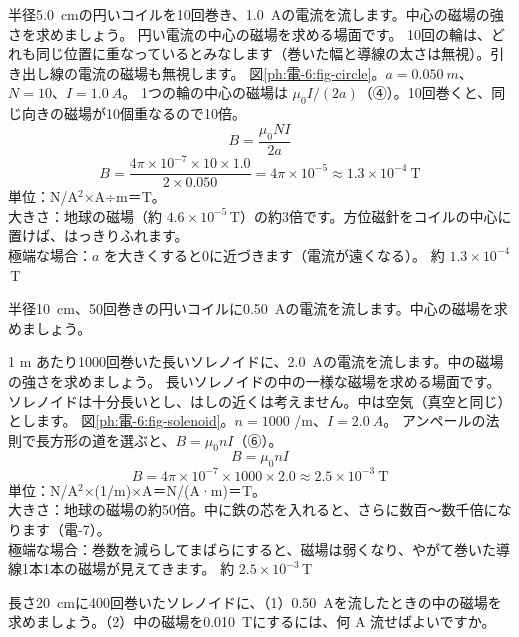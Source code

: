 \label{ph:電-6:ex2}
\begin{phreidai}[円いコイルの中心の磁場]
半径\qty{5.0}{cm}の円いコイルを10回巻き、\qty{1.0}{A}の電流を流します。中心の磁場の強さを求めましょう。
\phbamen
円い電流の中心の磁場を求める場面です。
\phmushi
10回の輪は、どれも同じ位置に重なっているとみなします（巻いた幅と導線の太さは無視）。引き出し線の電流の磁場も無視します。
\phzu
図\ref{ph:電-6:fig-circle}。$a=\qty{0.050}{m}$、$N=10$、$I=\qty{1.0}{A}$。
\phriyu
1つの輪の中心の磁場は $\mu_0I/(2a)$（④）。10回巻くと、同じ向きの磁場が10個重なるので10倍。
\phtateru
\[B=\frac{\mu_0NI}{2a}\]
\phtoku
\[B=\frac{4\pi\times10^{-7}\times10\times1.0}{2\times0.050}=4\pi\times10^{-5}\approx1.3\times10^{-4}\ \text{T}\]
\phtashikame
単位：N/A$^2$×A÷m＝T。\\
大きさ：地球の磁場（約 $4.6\times10^{-5}$\,T）の約3倍です。方位磁針をコイルの中心に置けば、はっきりふれます。\\
極端な場合：$a$ を大きくすると0に近づきます（電流が遠くなる）。
\kotae 約 $1.3\times10^{-4}$\,T
\end{phreidai}
\begin{jibun}
半径\qty{10}{cm}、50回巻きの円いコイルに\qty{0.50}{A}の電流を流します。中心の磁場を求めましょう。
\end{jibun}

\label{ph:電-6:ex3}
\begin{phreidai}[ソレノイドの中の磁場]
1 m あたり1000回巻いた長いソレノイドに、\qty{2.0}{A}の電流を流します。中の磁場の強さを求めましょう。
\phbamen
長いソレノイドの中の一様な磁場を求める場面です。
\phmushi
ソレノイドは十分長いとし、はしの近くは考えません。中は空気（真空と同じ）とします。
\phzu
図\ref{ph:電-6:fig-solenoid}。$n=1000$ /m、$I=\qty{2.0}{A}$。
\phriyu
アンペールの法則で長方形の道を選ぶと、$B=\mu_0nI$（⑥）。
\phtateru
\[B=\mu_0nI\]
\phtoku
\[B=4\pi\times10^{-7}\times1000\times2.0\approx2.5\times10^{-3}\ \text{T}\]
\phtashikame
単位：N/A$^2$×(1/m)×A＝N/(A·m)＝T。\\
大きさ：地球の磁場の約50倍。中に鉄の芯を入れると、さらに数百〜数千倍になります（電-7）。\\
極端な場合：巻数を減らしてまばらにすると、磁場は弱くなり、やがて巻いた導線1本1本の磁場が見えてきます。
\kotae 約 $2.5\times10^{-3}$\,T
\end{phreidai}
\begin{jibun}
長さ\qty{20}{cm}に400回巻いたソレノイドに、（1）\qty{0.50}{A}を流したときの中の磁場を求めましょう。（2）中の磁場を\qty{0.010}{T}にするには、何 A 流せばよいですか。
\end{jibun}


